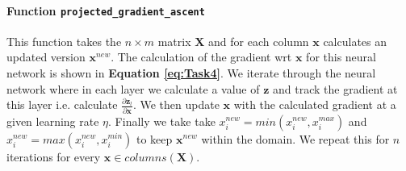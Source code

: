 \documentclass[11pt]{article}
\begin{document}
\paragraph{Function \texttt{projected\_gradient\_ascent}}
This function takes the $n\times m$ matrix $\boldsymbol{X}$ and for each column $\boldsymbol{x}$ calculates an updated version $\boldsymbol{x}^{new}$. 
The calculation of the gradient wrt $\boldsymbol{x}$ for this neural network is shown in \textbf{Equation \ref{eq:Task4}}.
We iterate through the neural network where in each layer we calculate a value of $\boldsymbol{z}$ and track the gradient at this layer i.e. calculate $\frac{\partial \boldsymbol{z}_l}{\partial \boldsymbol{x}}$. 
We then update $\boldsymbol{x}$ with the calculated gradient at a given learning rate $\eta$. 
Finally we take take $x^{new}_i = min(x^{new}_i,x^{max}_i)$ and $x^{new}_i = max(x^{new}_i,x^{min}_i)$ to keep $\boldsymbol{x}^{new}$ within the domain.
We repeat this for $n$ iterations for every $\boldsymbol{x} \in columns(\boldsymbol{X})$.
\end{document}
